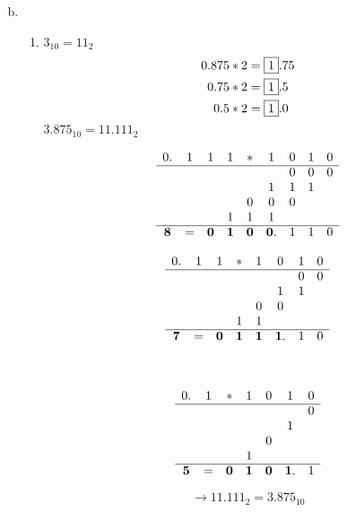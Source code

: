 \documentclass{article}
\begin{document}
\begin{enumerate}[a)]
\setcounter{enumi}{1}
\item
  \begin{enumerate}[1)]
  \item
    $3_{10} = 11_{2}$
    \begin{align*}
      0.875 * 2 &= \framebox{1}.75 \\
      0.75  * 2 &= \framebox{1}.5 \\
      0.5   * 2 &= \framebox{1}.0 \\
    \end{align*}
    $3.875_{10} = 11.111_{2}$
    
    \begin{minipage}[t]{.4\textwidth}
      \[
        \begin{array}{cccc cccc c}
          0.&1&1&1&*&1&0&1&0 \\
          \cline{0-8}
            & & & & & &0&0&0 \\
            & & & & &1&1&1 \\
            & & & &0&0&0 \\
            & & &1&1&1 \\
          \cline{0-8}
          \bm{8}&=&\bm{0}&\bm{1}&\bm{0}&\bm{0}.&1&1&0 \\
        \end{array}
      \]
    \end{minipage}
    \hfill
    \begin{minipage}[t]{.4\textwidth}
      \[
        \begin{array}{cccc cccc}
          0.&1&1&*&1&0&1&0 \\
          \cline{0-7}
            & & & & & &0&0 \\
            & & & & &1&1 \\
            & & & &0&0 \\
            & & &1&1 \\
          \cline{0-7}
          \bm{7}&=&\bm{0}&\bm{1}&\bm{1}&\bm{1}.&1&0 \\
        \end{array}
      \]
    \end{minipage}  \\
    
    \begin{minipage}{.4\textwidth}
      \[
        \begin{array}{cccc ccc}
          0.&1&*&1&0&1&0 \\
          \cline{0-6}
            & & & & & &0 \\
            & & & & &1 \\
            & & & &0 \\
            & & &1 \\
          \cline{0-6}
          \bm{5}&=&\bm{0}&\bm{1}&\bm{0}&\bm{1}.&1 \\
        \end{array}
      \]
    \end{minipage}
    \hfill
    \begin{minipage}{.4\textwidth}
      \[
        \rightarrow 11.111_{2} = 3.875_{10}
      \]
    \end{minipage}
    

\end{enumerate}
\end{enumerate}
\end{document}
